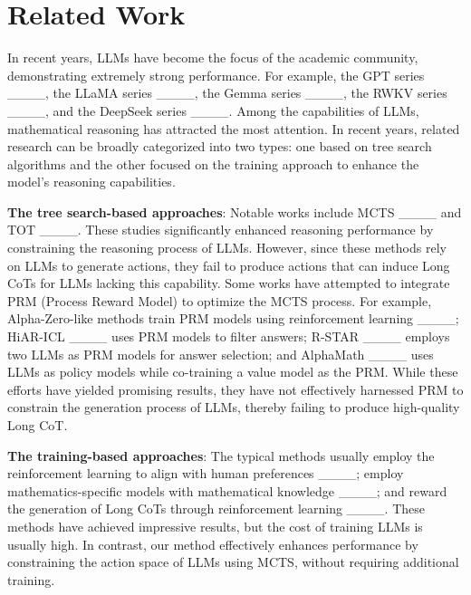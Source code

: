 \section{Related Work}
In recent years, LLMs have become the focus of the academic community, demonstrating extremely strong performance. For example, the GPT series ____, the LLaMA series ____, the Gemma series ____, the RWKV series ____, and the DeepSeek series ____.
Among the capabilities of LLMs, mathematical reasoning has attracted the most attention. In recent years, related research can be broadly categorized into two types: one based on tree search algorithms and the other focused on the training approach to enhance the model's reasoning capabilities.

\textbf{The tree search-based approaches}: Notable works include MCTS ____ and TOT ____. These studies significantly enhanced reasoning performance by constraining the reasoning process of LLMs. However, since these methods rely on LLMs to generate actions, they fail to produce actions that can induce Long CoTs for LLMs lacking this capability.  
Some works have attempted to integrate PRM (Process Reward Model) to optimize the MCTS process. For example, Alpha-Zero-like methods train PRM models using reinforcement learning ____; HiAR-ICL ____ uses PRM models to filter answers; R-STAR ____ employs two LLMs as PRM models for answer selection; and AlphaMath ____ uses LLMs as policy models while co-training a value model as the PRM. While these efforts have yielded promising results, they have not effectively harnessed PRM to constrain the generation process of LLMs, thereby failing to produce high-quality Long CoT.


\textbf{The training-based approaches}: The typical methods usually employ the reinforcement learning to align with human preferences ____; employ mathematics-specific models with mathematical knowledge ____; and reward the generation of Long CoTs through reinforcement learning ____. These methods have achieved impressive results, but the cost of training LLMs is usually high. In contrast, our method effectively enhances performance by constraining the action space of LLMs using MCTS, without requiring additional training.


%
